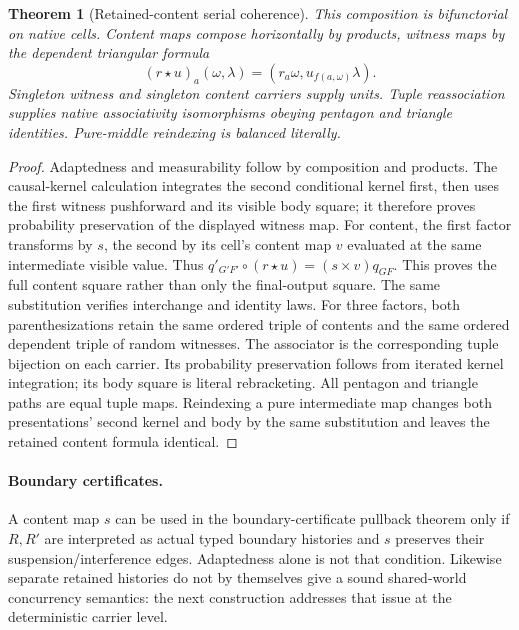 \documentclass[11pt]{article}
\newtheorem{theorem}{Theorem}[section]
\begin{document}
\begin{theorem}[Retained-content serial coherence]
This composition is bifunctorial on native cells. Content maps compose horizontally by products, witness maps by the dependent triangular formula
\[
 (r\star u)_a(\omega,\lambda)=(r_a\omega,u_{f(a,\omega)}\lambda).
\]
Singleton witness and singleton content carriers supply units. Tuple reassociation supplies native associativity isomorphisms obeying pentagon and triangle identities. Pure-middle reindexing is balanced literally.
\end{theorem}
\begin{proof}
Adaptedness and measurability follow by composition and products. The causal-kernel calculation integrates the second conditional kernel first, then uses the first witness pushforward and its visible body square; it therefore proves probability preservation of the displayed witness map. For content, the first factor transforms by $s$, the second by its cell's content map $v$ evaluated at the same intermediate visible value. Thus $q'_{G'F'}\circ(r\star u)=(s\times v)q_{GF}$. This proves the full content square rather than only the final-output square. The same substitution verifies interchange and identity laws. For three factors, both parenthesizations retain the same ordered triple of contents and the same ordered dependent triple of random witnesses. The associator is the corresponding tuple bijection on each carrier. Its probability preservation follows from iterated kernel integration; its body square is literal rebracketing. All pentagon and triangle paths are equal tuple maps. Reindexing a pure intermediate map changes both presentations' second kernel and body by the same substitution and leaves the retained content formula identical.
\end{proof}

\paragraph{Boundary certificates.} A content map $s$ can be used in the boundary-certificate pullback theorem only if $R,R'$ are interpreted as actual typed boundary histories and $s$ preserves their suspension/interference edges. Adaptedness alone is not that condition. Likewise separate retained histories do not by themselves give a sound shared-world concurrency semantics: the next construction addresses that issue at the deterministic carrier level.
\end{document}
